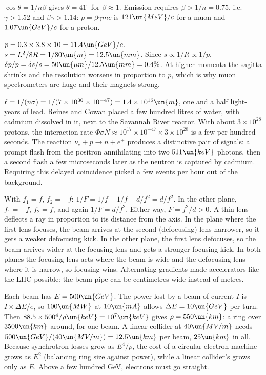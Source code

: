  $\cos\theta = 1/n\beta$ gives $\theta = 41^\circ$ for $\beta\approx1$. Emission requires $\beta>1/n = 0.75$, i.e.\ $\gamma>1.52$ and $\beta\gamma>1.14$: $p = \beta\gamma mc$ is $121\un{MeV}/c$ for a muon and $1.07\un{GeV}/c$ for a proton.

 $p = 0.3\times3.8\times10 = 11.4\un{GeV}/c$. $s = L^2/8R = 1/80\un{m} = 12.5\un{mm}$. Since $s\propto1/R\propto1/p$, $\delta p/p = \delta s/s = 50\un{\mu m}/12.5\un{mm} = 0.4\%$. At higher momenta the sagitta shrinks and the resolution worsens in proportion to $p$, which is why muon spectrometers are huge and their magnets strong.

 $\ell = 1/(n\sigma) = 1/(7\times10^{30}\times10^{-47}) = 1.4\times10^{16}\un{m}$, one and a half light-years of lead. Reines and Cowan placed a few hundred litres of water, with cadmium dissolved in it, next to the Savannah River reactor. With about $3\times10^{28}$ protons, the interaction rate $\Phi\sigma N\approx10^{17}\times10^{-47}\times3\times10^{28}$ is a few per hundred seconds. The reaction $\bar\nu_e + p\to n + e^+$ produces a distinctive pair of signals: a prompt flash from the positron annihilating into two $511\un{keV}$ photons, then a second flash a few microseconds later as the neutron is captured by cadmium. Requiring this delayed coincidence picked a few events per hour out of the background.

 With $f_1 = f$, $f_2 = -f$: $1/F = 1/f - 1/f + d/f^2 = d/f^2$. In the other plane, $f_1 = -f$, $f_2 = f$, and again $1/F = d/f^2$. Either way, $F = f^2/d>0$. A thin lens deflects a ray in proportion to its distance from the axis. In the plane where the first lens focuses, the beam arrives at the second (defocusing) lens narrower, so it gets a weaker defocusing kick. In the other plane, the first lens defocuses, so the beam arrives wider at the focusing lens and gets a stronger focusing kick. In both planes the focusing lens acts where the beam is wide and the defocusing lens where it is narrow, so focusing wins. Alternating gradients made accelerators like the LHC possible: the beam pipe can be centimetres wide instead of metres.

 Each beam has $E = 500\un{GeV}$. The power lost by a beam of current $I$ is $I\times\Delta E/e$, so $100\un{MW}$ at $10\un{mA}$ allows $\Delta E = 10\un{GeV}$ per turn. Then $88.5\times500^4/\rho\un{keV} = 10^7\un{keV}$ gives $\rho = 550\un{km}$: a ring over $3500\un{km}$ around, for one beam. A linear collider at $40\un{MV/m}$ needs $500\un{GeV}/(40\un{MV/m}) = 12.5\un{km}$ per beam, $25\un{km}$ in all. Because synchrotron losses grow as $E^4/\rho$, the cost of a circular electron machine grows as $E^2$ (balancing ring size against power), while a linear collider's grows only as $E$. Above a few hundred GeV, electrons must go straight.

